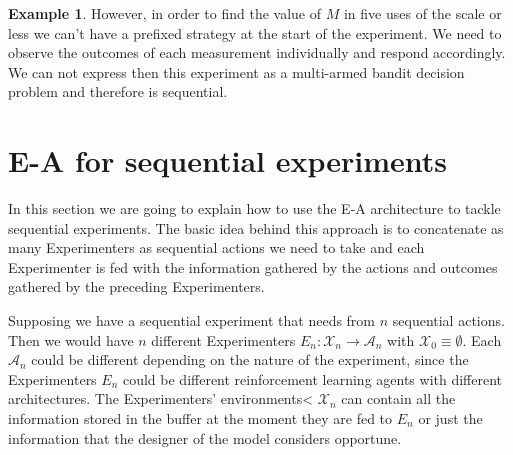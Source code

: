 \documentclass[11pt,a4paper,twoside]{report}
\newcommand{\+}{\textnormal{+} }
\theoremstyle{definition}
\newtheorem{myex}[mythm]{Example}
\numberwithin{equation}{chapter}
\begin{document}
\begin{myex}
However, in order to find the value of $M$ in five uses of the scale or less we
can't have a prefixed strategy at the start of the experiment. We need to
observe the outcomes of each measurement individually and respond accordingly.
We can not express then this experiment as a multi-armed bandit decision
problem and therefore is sequential.

\end{myex}

\section{E-A for sequential experiments}

In this section we are going to explain how to use the E-A architecture to
tackle sequential experiments. The basic idea behind this approach is to
concatenate as many Experimenters as sequential actions we need to take and each
Experimenter is fed with the information gathered by the actions and outcomes
gathered by the preceding Experimenters. 

Supposing we have a sequential experiment that needs from $n$ sequential
actions. Then we would have $n$ different Experimenters
$E_n:\mathcal{X}_n\rightarrow \mathcal{A}_n$ with
$\mathcal{X}_0\equiv\emptyset$. Each $\mathcal{A}_n$ could be different
depending on the nature of the experiment, since the Experimenters $E_n$ could
be different reinforcement learning agents with different architectures. The
Experimenters' environments< $\mathcal{X}_n$ can contain all the information
stored in the buffer at the moment they are fed to $E_n$ or just the
information that the designer of the model considers opportune.


%
%
\end{document}

